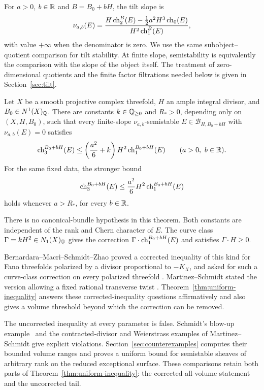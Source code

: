 For $a>0$, $b\in\mathbb R$ and $B=B_0+bH$, the tilt slope is
\begin{equation}\label{eq:intro-tilt}
 \nu_{a,b}(E)=
 \frac{H\operatorname{ch}_2^B(E)-\tfrac12a^2H^3\operatorname{ch}_0(E)}
      {H^2\operatorname{ch}_1^B(E)},
\end{equation}
with value $+\infty$ when the denominator is zero.
We use the same subobject--quotient comparison for tilt stability.
At finite slope, semistability is equivalently the comparison with the
slope of the object itself. The treatment of zero-dimensional quotients
and the finite factor filtrations needed below is given in
Section~\ref{sec:tilt}.

\begin{theorem}\label{thm:uniform-inequality}
Let $X$ be a smooth projective complex threefold, $H$ an ample integral
divisor, and $B_0\in N^1(X)_{\mathbb Q}$.
There are constants $k\in\mathbb Q_{\geq0}$ and $R_*>0$, depending only on
$(X,H,B_0)$, such that every finite-slope $\nu_{a,b}$-semistable
$E\in\mathcal B_{H,B_0+bH}$ with $\nu_{a,b}(E)=0$ satisfies
\begin{equation}\label{eq:intro-corrected}
 \operatorname{ch}_3^{B_0+bH}(E)
 \leq \left(\frac{a^2}{6}+k\right)H^2\operatorname{ch}_1^{B_0+bH}(E)
 \qquad(a>0,\ b\in\mathbb R).
\end{equation}
For the same fixed data, the stronger bound
\begin{equation}\label{eq:intro-tail}
 \operatorname{ch}_3^{B_0+bH}(E)
 \leq \frac{a^2}{6}H^2\operatorname{ch}_1^{B_0+bH}(E)
\end{equation}
holds whenever $a>R_*$, for every $b\in\mathbb R$.
\end{theorem}

There is no canonical-bundle hypothesis in this theorem. Both constants
are independent of the rank and Chern character of $E$. The curve class
$\Gamma=kH^2\in N_1(X)_{\mathbb Q}$ gives the correction
$\Gamma\cdot\operatorname{ch}_1^{B_0+bH}(E)$ and satisfies $\Gamma\cdot H\geq0$.

Bernardara--Macr\`i--Schmidt--Zhao proved a corrected inequality of this
kind for Fano threefolds polarized by a divisor proportional to $-K_X$,
and asked for such a curve-class correction
on every polarized threefold
\cite[Theorem~1.1 and Question~2.4]{BMSZ2017}.
Martinez--Schmidt stated the version allowing a fixed rational
transverse twist \cite[Question~2.6]{MartinezSchmidt2019}.
Theorem~\ref{thm:uniform-inequality} answers these corrected-inequality
questions affirmatively and also gives a volume threshold beyond which
the correction can be removed.

The uncorrected inequality at every parameter is false. Schmidt's
blow-up example~\cite[Theorem~3.1]{Schmidt2017} and the contracted-divisor
and Weierstrass examples of Martinez--Schmidt
\cite[Theorem~1.1]{MartinezSchmidt2019} give explicit violations.
Section~\ref{sec:counterexamples} computes their bounded volume ranges
and proves a uniform bound for semistable sheaves of arbitrary rank on
the reduced exceptional surface. These comparisons retain both parts of
Theorem~\ref{thm:uniform-inequality}: the corrected all-volume statement
and the uncorrected tail.

